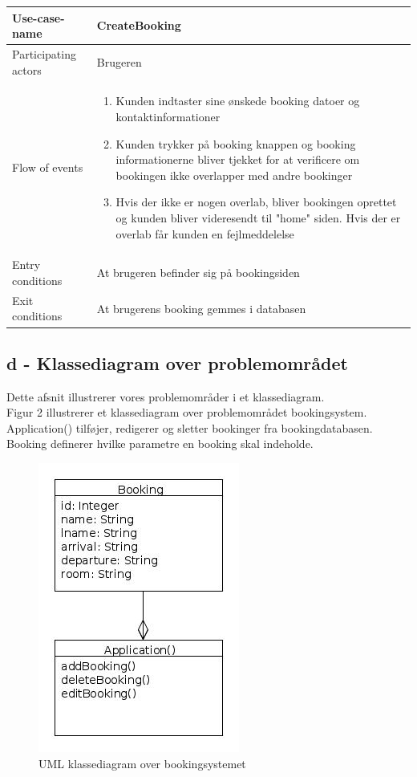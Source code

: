 \documentclass[12pt,a4paper]{article}
\begin{document}
\bigskip

\begin{minipage}{\textwidth}

 \label{tab:title}
\begin{tabular}{| p{5cm} p{10cm} |}
\hline Use-case-name & CreateBooking \\
\hline Participating actors & Brugeren \\
\hline Flow of events & \begin{enumerate}
\item Kunden indtaster sine ønskede booking datoer og kontaktinformationer 
\item Kunden trykker på booking knappen og booking informationerne bliver tjekket for at verificere om bookingen ikke overlapper med andre bookinger
\item Hvis der ikke er nogen overlab, bliver bookingen oprettet og kunden bliver videresendt til "home" siden. Hvis der er overlab får kunden en fejlmeddelelse
\end{enumerate} \\
\hline Entry conditions & At brugeren befinder sig på bookingsiden \\
\hline Exit conditions & At brugerens booking gemmes i databasen  \\
\hline
\end{tabular}

\end{minipage}	
	
\subsection{d - Klassediagram over problemområdet}
Dette afsnit illustrerer vores problemområder i et klassediagram.\\
Figur 2 illustrerer et klassediagram over problemområdet  bookingsystem. Application() tilføjer, redigerer og sletter bookinger fra bookingdatabasen. Booking definerer hvilke parametre en booking skal indeholde.
\begin{figure}[H]
\centering
\includegraphics[scale=0.6]{BookingSystem.jpg}
\caption{UML klassediagram over bookingsystemet}
\end{figure}
\end{document}
